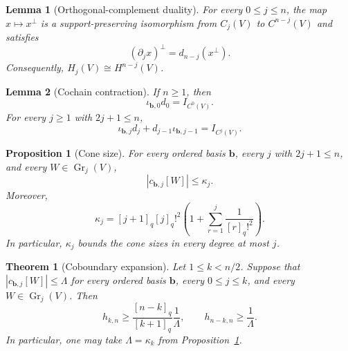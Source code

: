 \documentclass[10pt,a4paper]{amsart}
\newtheorem{lemma}{Lemma}
\newtheorem{proposition}{Proposition}
\newtheorem{theorem}{Theorem}
\newcommand{\Gr}{\operatorname{Gr}}
\begin{document}
\begin{lemma}[Orthogonal-complement duality]
\label{lem:orthogonal-complement-duality}
For every $0\le j\le n$, the map $x\mapsto x^\perp$ is a
support-preserving isomorphism from $C_j(V)$ to $C^{n-j}(V)$ and
satisfies
\[
 (\partial_jx)^\perp=d_{n-j}(x^\perp).
\]
Consequently,
$H_j(V)\cong H^{n-j}(V)$.
\end{lemma}

\begin{lemma}[Cochain contraction]\label{lem:cochain-contraction}
If $n\ge1$, then
\[
 \iota_{\mathbf b,0}d_0=I_{C^0(V)}.
\]
For every $j\ge1$ with $2j+1\le n$,
\[
 \iota_{\mathbf b,j}d_j
 +
 d_{j-1}\iota_{\mathbf b,j-1}
 =
 I_{C^j(V)}.
\]
\end{lemma}

\begin{proposition}[Cone size]\label{prop:cone-size}
For every ordered basis $\mathbf b$, every $j$ with $2j+1\le n$,
and every $W\in\Gr_j(V)$,
\[
 |c_{\mathbf b,j}[W]|\le\kappa_j.
\]
Moreover,
\[
 \kappa_j
 =
 [j+1]_q[j]_q!^2
 \left(
 1+\sum_{r=1}^j\frac{1}{[r]_q!^2}
 \right).
\]
In particular, $\kappa_j$ bounds the cone sizes in every degree at most
$j$.
\end{proposition}

\begin{theorem}[Coboundary expansion]
\label{thm:grassmann-coboundary-expansion}
Let $1\le k<n/2$. Suppose that
$|c_{\mathbf b,j}[W]|\le\Lambda$ for every ordered basis $\mathbf b$,
every $0\le j\le k$, and every $W\in\Gr_j(V)$. Then
\[
 h_{k,n}
 \ge
 \frac{[n-k]_q}{[k+1]_q}\frac1\Lambda,
 \qquad
 h_{n-k,n}\ge\frac1\Lambda.
\]
In particular, one may take $\Lambda=\kappa_k$ from
Proposition~\ref{prop:cone-size}.
\end{theorem}
\end{document}
